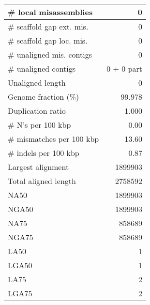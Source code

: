 \documentclass[12pt,a4paper]{article}
\begin{document}
\begin{table}[ht]
\begin{center}
\begin{tabular}{|l*{1}{|r}|}
\# local misassemblies & 0 \\ \hline
\# scaffold gap ext. mis. & 0 \\ \hline
\# scaffold gap loc. mis. & 0 \\ \hline
\# unaligned mis. contigs & 0 \\ \hline
\# unaligned contigs & 0 + 0 part \\ \hline
Unaligned length & 0 \\ \hline
Genome fraction (\%) & 99.978 \\ \hline
Duplication ratio & 1.000 \\ \hline
\# N's per 100 kbp & 0.00 \\ \hline
\# mismatches per 100 kbp & 13.60 \\ \hline
\# indels per 100 kbp & 0.87 \\ \hline
Largest alignment & 1899903 \\ \hline
Total aligned length & 2758592 \\ \hline
NA50 & 1899903 \\ \hline
NGA50 & 1899903 \\ \hline
NA75 & 858689 \\ \hline
NGA75 & 858689 \\ \hline
LA50 & 1 \\ \hline
LGA50 & 1 \\ \hline
LA75 & 2 \\ \hline
LGA75 & 2 \\ \hline
\end{tabular}
\end{center}
\end{table}
\end{document}
